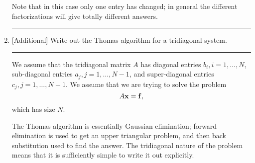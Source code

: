 \documentclass[10pt]{article}
\begin{document}
\begin{enumerate}
  Note that in this case only one entry has changed; in general the
  different factorizations will give totally different answers.
  \begin{center}
    \rule{0.9\textwidth}{.1pt}
  \end{center}
\item{} [Additional] Write out the Thomas algorithm for a tridiagonal
  system.
  \begin{center}
    \rule{0.9\textwidth}{.1pt}
  \end{center}
  We assume that the tridiagonal matrix $A$ has diagonal entries $b_i,
  i = 1, \dots, N$, sub-diagonal entries $a_j, j = 1, \dots, N-1$, and
  super-diagonal entries $c_j, j = 1, \dots, N-1$. We assume that we
  are trying to solve the problem
  \begin{equation*}
    A {\bf x} = {\bf f},
  \end{equation*}
  which has size $N$.

  The Thomas algorithm is essentially Gaussian elimination; forward
  elimination is used to get an upper triangular problem, and then
  back substitution used to find the answer. The tridiagonal nature of
  the problem means that it is sufficiently simple to write it out
  explicitly. 


\end{enumerate}
\end{document}
